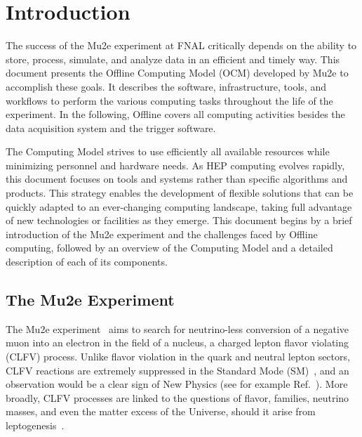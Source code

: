 \section {Introduction}
\label{sec:introduction}


The success of the Mu2e experiment at FNAL critically depends on the ability to store, process, simulate, and analyze data in an efficient and timely way. This document presents the Offline Computing Model (OCM) developed by Mu2e to accomplish these goals. It describes the software, infrastructure, tools, and workflows to perform the various computing tasks throughout the life of the experiment. In the following, Offline covers all computing activities besides the data acquisition system and the trigger software. 

The Computing Model strives to use efficiently all available resources while minimizing personnel and hardware needs. As HEP computing evolves rapidly, this document focuses on tools and systems rather than specific algorithms and products. This strategy enables the development of flexible solutions that can be quickly adapted to an ever-changing computing landscape, taking full advantage of new technologies or facilities as they emerge. This document begins by a brief introduction of the Mu2e experiment and the challenges faced by Offline computing, followed by an overview of the Computing Model and a detailed description of each of its components.

\subsection {The Mu2e Experiment}
The Mu2e experiment~\cite{TDR} aims to search for neutrino-less conversion of a negative muon into an electron in the field of a nucleus, a charged lepton flavor violating (CLFV) process. Unlike flavor violation in the quark and neutral lepton sectors, CLFV reactions are extremely suppressed in the Standard Mode (SM)~\cite{Petcov:1976ff, Marciano:1977wx, Lee:1977qz, Lee:1977tib, Blackstone:2019njl}, and an observation would be a clear sign of New Physics (see for example Ref.~\cite{Calibbi:2017uvl}). More broadly, CLFV processes are linked to the questions of flavor, families, neutrino masses, and even the matter excess of the Universe, should it arise from leptogenesis~\cite{Fukugita:1986hr, Davidson:2008bu}. 

